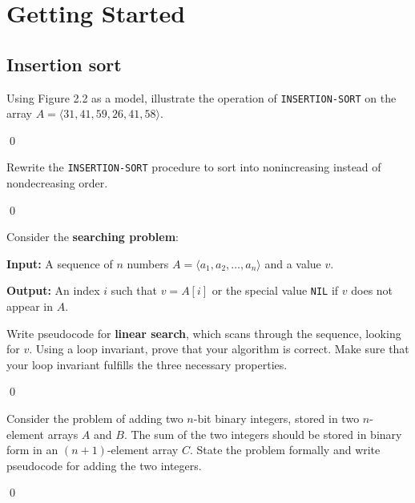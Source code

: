 \chapter{Getting Started}
\section{Insertion sort}

 Using Figure 2.2 as a model, illustrate the operation of \verb|INSERTION-SORT| on the array $A = \langle 31, 41, 59, 26, 41, 58\rangle$.

\sol \qed

 Rewrite the \verb|INSERTION-SORT| procedure to sort into nonincreasing instead of nondecreasing order.

\sol \qed

 Consider the \textbf{searching problem}:

\textbf{Input:} A sequence of $n$ numbers $A = \langle a_1, a_2, \dots, a_n \rangle$ and a value $v$.

\textbf{Output:} An index $i$ such that $v = A[i]$ or the special value \verb|NIL| if $v$ does not appear in $A$.

Write pseudocode for \textbf{linear search}, which scans through the sequence, looking for $v$. Using a loop invariant, prove that your algorithm is correct. Make sure that your loop invariant fulfills the three necessary properties.

\sol \qed

 Consider the problem of adding two $n$-bit binary integers, stored in two $n$-element arrays $A$ and $B$. The sum of the two integers should be stored in binary form in an $(n+1)$-element array $C$. State the problem formally and write pseudocode for adding the two integers.

\sol \qed